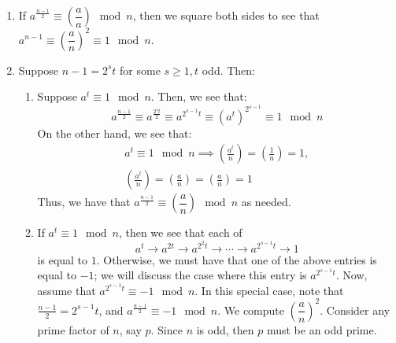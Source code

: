 \documentclass{article}
\begin{document}
\begin{pf}[source=Primary Source Material]
    \begin{enumerate}
        \item If $ a^{\frac{n-1}{2}} \equiv \left( \dfrac{a}{a} \right) \mod n $,
            then we square both sides to see that $ a^{n-1} \equiv \left( \dfrac{a}{n} \right)^{2}
            \equiv 1 \mod n $.
        \item Suppose $ n-1 = 2^{s}t $ for some $ s \geq 1, t $ odd. Then:
        \begin{enumerate}
            \item Suppose $ a^{t} \equiv 1 \mod n $. Then, we see that:
                \begin{equation*}
                    a^{\frac{n-1}{2}} \equiv a^{\frac{2^{s}t}{2}} \equiv a^{2^{s - 1}t}
                    \equiv (a^{t})^{2^{s - 1}} \equiv 1 \mod n
                \end{equation*}
            On the other hand, we see that:
                \begin{gather*}
                    a^{t} \equiv 1 \mod n \implies \left( \frac{a^{t}}{n} \right)
                    = \left( \frac{1}{n} \right) = 1, \\
                    \left( \frac{a^{t}}{n} \right) = \left( \frac{a}{n} \right)
                    = \left( \frac{a}{n} \right) = 1
                \end{gather*}
                Thus, we have that $ a^{\frac{n-1}{2}} \equiv \left( \dfrac{a}{n} \right)
                \mod n $ as needed.
            \item If $ a^{t} \equiv 1 \mod n $, then we see that each of
                \begin{equation*}
                    a^{t} \rightarrow a^{2t} \rightarrow a^{2^{2}t} \rightarrow \cdots
                    \rightarrow a^{2^{s - 1}t} \rightarrow 1
                \end{equation*}
                is equal to $ 1 $. Otherwise, we must have that one of the above entries is equal
                to $ -1 $; we will discuss the case where this entry is $ a^{2^{s - 1}t} $. \vsp
                Now, assume that $ a^{2^{s - 1}t} \equiv -1 \mod n $.
                In this special case, note that $ \frac{n-1}{2} = 2^{s-1}t $, and
                $ a^{\frac{n-1}{2}} \equiv -1 \mod n $.
                We compute $ \left( \dfrac{a}{n} \right)^{2} $. \vsp
                Consider any prime factor of $ n $, say $ p $.
                Since $ n $ is odd, then $ p $ must be an odd prime.

\end{enumerate}
\end{enumerate}
\end{pf}
\end{document}
